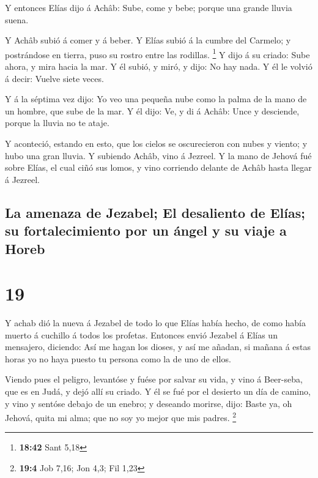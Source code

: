  Y entonces Elías dijo á Achâb: Sube, come y bebe; porque
una grande lluvia suena.

 Y Achâb subió á comer y á beber. Y Elías subió á la cumbre
del Carmelo; y postrándose en tierra, puso su rostro entre las rodillas.
\footnote{\textbf{18:42} Sant 5,18}  Y dijo á su criado:
Sube ahora, y mira hacia la mar. Y él subió, y miró, y dijo: No hay
nada. Y él le volvió á decir: Vuelve siete veces.

 Y á la séptima vez dijo: Yo veo una pequeña nube como la
palma de la mano de un hombre, que sube de la mar. Y él dijo: Ve, y di á
Achâb: Unce y desciende, porque la lluvia no te ataje.

 Y aconteció, estando en esto, que los cielos se
oscurecieron con nubes y viento; y hubo una gran lluvia. Y subiendo
Achâb, vino á Jezreel.  Y la mano de Jehová fué sobre
Elías, el cual ciñó sus lomos, y vino corriendo delante de Achâb hasta
llegar á Jezreel.

\hypertarget{la-amenaza-de-jezabel-el-desaliento-de-eluxedas-su-fortalecimiento-por-un-uxe1ngel-y-su-viaje-a-horeb}{%
\subsection{La amenaza de Jezabel; El desaliento de Elías; su
fortalecimiento por un ángel y su viaje a
Horeb}\label{la-amenaza-de-jezabel-el-desaliento-de-eluxedas-su-fortalecimiento-por-un-uxe1ngel-y-su-viaje-a-horeb}}

\hypertarget{section-18}{%
\section{19}\label{section-18}}

 Y achab dió la nueva á Jezabel de todo lo que Elías había
hecho, de como había muerto á cuchillo á todos los profetas.
 Entonces envió Jezabel á Elías un mensajero, diciendo: Así
me hagan los dioses, y así me añadan, si mañana á estas horas yo no haya
puesto tu persona como la de uno de ellos.

 Viendo pues el peligro, levantóse y fuése por salvar su
vida, y vino á Beer-seba, que es en Judá, y dejó allí su criado.
 Y él se fué por el desierto un día de camino, y vino y
sentóse debajo de un enebro; y deseando morirse, dijo: Baste ya, oh
Jehová, quita mi alma; que no soy yo mejor que mis padres. \footnote{\textbf{19:4}
  Job 7,16; Jon 4,3; Fil 1,23}

